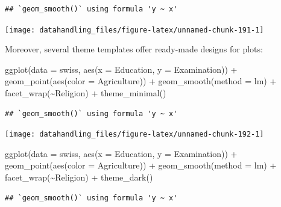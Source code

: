 \documentclass[
  12pt,
]{style/krantz}
\newenvironment{Shaded}{\begin{snugshade}}{\end{snugshade}}
\newcommand{\AttributeTok}[1]{\textcolor[rgb]{0.77,0.63,0.00}{#1}}
\newcommand{\FunctionTok}[1]{\textcolor[rgb]{0.00,0.00,0.00}{#1}}
\newcommand{\NormalTok}[1]{#1}
\newcommand{\SpecialCharTok}[1]{\textcolor[rgb]{0.00,0.00,0.00}{#1}}
\newcommand{\StringTok}[1]{\textcolor[rgb]{0.31,0.60,0.02}{#1}}
\begin{document}
\begin{verbatim}
## `geom_smooth()` using formula 'y ~ x'
\end{verbatim}

\texttt{[image: datahandling\_files/figure-latex/unnamed-chunk-191-1]}

Moreover, several theme templates offer ready-made designs for plots:

\begin{Shaded}
\begin{Highlighting}[]
\FunctionTok{ggplot}\NormalTok{(}\AttributeTok{data =}\NormalTok{ swiss, }\FunctionTok{aes}\NormalTok{(}\AttributeTok{x =}\NormalTok{ Education, }\AttributeTok{y =}\NormalTok{ Examination)) }\SpecialCharTok{+}
     \FunctionTok{geom\_point}\NormalTok{(}\FunctionTok{aes}\NormalTok{(}\AttributeTok{color =}\NormalTok{ Agriculture)) }\SpecialCharTok{+}
     \FunctionTok{geom\_smooth}\NormalTok{(}\AttributeTok{method =} \StringTok{\textquotesingle{}lm\textquotesingle{}}\NormalTok{) }\SpecialCharTok{+}
     \FunctionTok{facet\_wrap}\NormalTok{(}\SpecialCharTok{\textasciitilde{}}\NormalTok{Religion) }\SpecialCharTok{+}
     \FunctionTok{theme\_minimal}\NormalTok{()}
\end{Highlighting}
\end{Shaded}

\begin{verbatim}
## `geom_smooth()` using formula 'y ~ x'
\end{verbatim}

\texttt{[image: datahandling\_files/figure-latex/unnamed-chunk-192-1]}

\begin{Shaded}
\begin{Highlighting}[]
\FunctionTok{ggplot}\NormalTok{(}\AttributeTok{data =}\NormalTok{ swiss, }\FunctionTok{aes}\NormalTok{(}\AttributeTok{x =}\NormalTok{ Education, }\AttributeTok{y =}\NormalTok{ Examination)) }\SpecialCharTok{+}
     \FunctionTok{geom\_point}\NormalTok{(}\FunctionTok{aes}\NormalTok{(}\AttributeTok{color =}\NormalTok{ Agriculture)) }\SpecialCharTok{+}
     \FunctionTok{geom\_smooth}\NormalTok{(}\AttributeTok{method =} \StringTok{\textquotesingle{}lm\textquotesingle{}}\NormalTok{) }\SpecialCharTok{+}
     \FunctionTok{facet\_wrap}\NormalTok{(}\SpecialCharTok{\textasciitilde{}}\NormalTok{Religion) }\SpecialCharTok{+}
     \FunctionTok{theme\_dark}\NormalTok{()}
\end{Highlighting}
\end{Shaded}

\begin{verbatim}
## `geom_smooth()` using formula 'y ~ x'
\end{verbatim}
\end{document}
